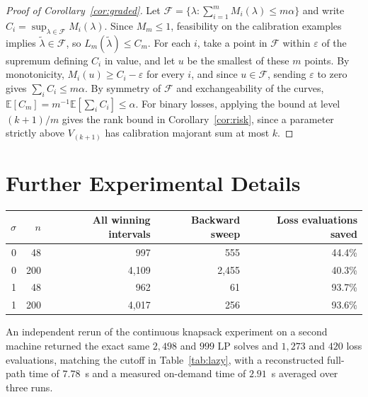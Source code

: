 \documentclass[a4paper,10pt]{article}
\theoremstyle{plain}
\theoremstyle{remark}
\begin{document}
\begin{proof}[Proof of Corollary~\ref{cor:graded}]
Let $\mathcal F=\{\lambda:\sum_{i=1}^{m}M_i(\lambda)\le m\alpha\}$ and write $C_i=\sup_{\lambda\in\mathcal F}M_i(\lambda)$. Since $M_m\le1$, feasibility on the calibration examples implies $\widetilde\lambda\in\mathcal F$, so $L_m(\widetilde\lambda)\le C_m$. For each $i$, take a point in $\mathcal F$ within $\varepsilon$ of the supremum defining $C_i$ in value, and let $u$ be the smallest of these $m$ points. By monotonicity, $M_i(u)\ge C_i-\varepsilon$ for every $i$, and since $u\in\mathcal F$, sending $\varepsilon$ to zero gives $\sum_i C_i\le m\alpha$. By symmetry of $\mathcal F$ and exchangeability of the curves, $\mathbb E[C_m]=m^{-1}\mathbb E[\sum_i C_i]\le\alpha$. For binary losses, applying the bound at level $(k+1)/m$ gives the rank bound in Corollary~\ref{cor:risk}, since a parameter strictly above $V_{(k+1)}$ has calibration majorant sum at most $k$.
\end{proof}

\section{Further Experimental Details}\label{sec:details}

\vspace{2pt}
\noindent\begin{minipage}{\linewidth}
\centering\small
{}
\label{tab:sweep}
\vspace{2pt}
\begin{tabular}{@{}rrrrr@{}}
\toprule
$\sigma$ & $n$ & All winning intervals & Backward sweep & Loss evaluations saved\\
\midrule
0 & 48  & 997   & 555   & 44.4\% \\
0 & 200 & 4,109 & 2,455 & 40.3\% \\
1 & 48  & 962   & 61    & 93.7\% \\
1 & 200 & 4,017 & 256   & 93.6\% \\
\bottomrule
\end{tabular}
\end{minipage}
\vspace{4pt}

An independent rerun of the continuous knapsack experiment on a second machine returned the exact same $2{,}498$ and $999$ LP solves and $1{,}273$ and $420$ loss evaluations, matching the cutoff in Table~\ref{tab:lazy}, with a reconstructed full-path time of $7.78$~s and a measured on-demand time of $2.91$~s averaged over three runs.
\end{document}
